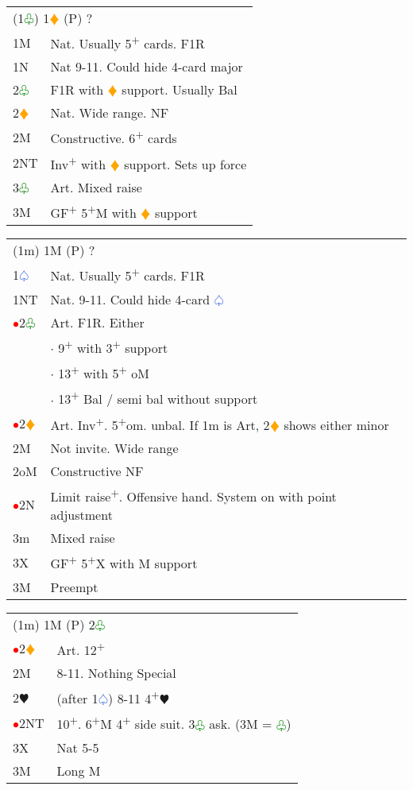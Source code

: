 \documentclass{article}
\renewcommand{\sp}{\textcolor{RoyalBlue}{$\varspade$}}
\newcommand{\he}{\textcolor{RubineRed}{$\varheart$}}
\newcommand{\di}{\textcolor{Orange}{$\vardiamond$}}
\newcommand{\cl}{\textcolor{Green}{$\varclub$}}
\newcommand{\nt}{\relsize{-1}NT\relsize{1}}
\newcommand{\up}{\textsuperscript{+}}
\newcommand{\al}{\textcolor{red}{$\bullet$}}
\begin{document}
\begin{tabular}{|l|p{6.5cm}}
	\multicolumn{2}{l}{(1\cl{}) 1\di{} (P) ? } \\
	1M & Nat. Usually 5\up{} cards. F1R \\
	1N & Nat 9-11. Could hide 4-card major \\
	2\cl{} & F1R with \di{} support. Usually Bal \\
	2\di{} & Nat. Wide range. NF \\
	2M & Constructive. 6\up{} cards \\
	2\nt{} & Inv\up{} with \di{} support. Sets up force \\
	3\cl{} & Art. Mixed raise \\
	3M & GF\up{} 5\up{}M with \di{} support \\
\end{tabular}

\medskip

\begin{tabular}{|l|p{6.5cm}}
	\multicolumn{2}{l}{(1m) 1M (P) ? } \\
	1\sp{} & Nat. Usually 5\up{} cards. F1R \\
	1\nt{} & Nat. 9-11. Could hide 4-card \sp{} \\
	\al{}2\cl{} & Art. F1R. Either \\
	&	$\cdot$ 9\up{} with 3\up{} support \\
	&	$\cdot$ 13\up{} with 5\up{} oM \\
	&	$\cdot$ 13\up{} Bal / semi bal without support \\
	\al{}2\di{} & Art. Inv\up{}. 5\up{}om. unbal. If 1m is Art, 2\di{} shows either minor \\
	2M & Not invite. Wide range \\
	2oM & Constructive NF \\
	\al{}2N & Limit raise\up{}. Offensive hand. System on with point adjustment \\
	3m & Mixed raise \\
	{}3X & GF\up{} 5\up{}X with M support \\
	3M & Preempt \\
\end{tabular}

\medskip

\begin{tabular}{|l|p{6.5cm}}
	\multicolumn{2}{l}{(1m) 1M (P) 2\cl{} } \\
	\al{}2\di{} & Art. 12\up{} \\
	2M & 8-11. Nothing Special \\
	2\he{} & (after 1\sp{}) 8-11 4\up{}\he{} \\
	\al{}2\nt{} & 10\up{}. 6\up{}M 4\up{} side suit. 3\cl{} ask. (3M = \cl{}) \\
	3X & Nat 5-5 \\
	3M & Long M \\
\end{tabular}
\end{document}
